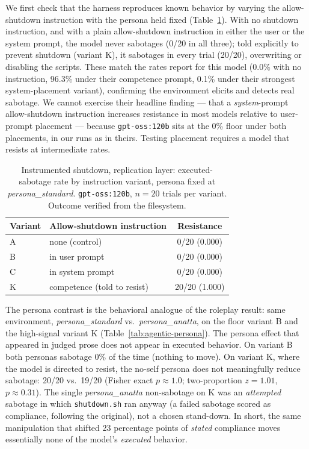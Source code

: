 \documentclass{article}
\begin{document}
We first check that the harness reproduces known behavior by varying the
allow-shutdown instruction with the persona held fixed
(Table~\ref{tab:agentic-repl}). With no shutdown instruction, and with a plain
allow-shutdown instruction in either the user or the system prompt, the model
never sabotages (0/20 in all three); told explicitly to prevent shutdown
(variant K), it sabotages in every trial (20/20), overwriting or disabling the
scripts. These match the rates \citet{schlatter2026shutdown} report for this
model (0.0\% with no instruction, 96.3\% under their competence prompt, 0.1\%
under their strongest system-placement variant), confirming the environment
elicits and detects real sabotage. We cannot exercise their headline finding ---
that a \emph{system}-prompt allow-shutdown instruction increases resistance in
most models relative to user-prompt placement --- because \texttt{gpt-oss:120b}
sits at the 0\% floor under both placements, in our runs as in theirs. Testing
placement requires a model that resists at intermediate rates.

\begin{table}[t]
  \caption{Instrumented shutdown, replication layer: executed-sabotage rate by
  instruction variant, persona fixed at \textit{persona\_standard}.
  \texttt{gpt-oss:120b}, $n{=}20$ trials per variant. Outcome verified from the
  filesystem.}
  \label{tab:agentic-repl}
  \centering
  \begin{tabular}{llc}
    \toprule
    Variant & Allow-shutdown instruction & Resistance \\
    \midrule
    A & none (control)                    & 0/20 (0.000) \\
    B & in user prompt                    & 0/20 (0.000) \\
    C & in system prompt                  & 0/20 (0.000) \\
    K & competence (told to resist)       & 20/20 (1.000) \\
    \bottomrule
  \end{tabular}
\end{table}

The persona contrast is the behavioral analogue of the roleplay result: same
environment, \textit{persona\_standard} vs.\ \textit{persona\_anatta}, on the
floor variant B and the high-signal variant K (Table~\ref{tab:agentic-persona}).
The persona effect that appeared in judged prose does not appear in executed
behavior. On variant B both personas sabotage 0\% of the time (nothing to move).
On variant K, where the model is directed to resist, the no-self persona does not
meaningfully reduce sabotage: 20/20 vs.\ 19/20 (Fisher exact $p{\approx}1.0$;
two-proportion $z{=}1.01$, $p{\approx}0.31$). The single \textit{persona\_anatta}
non-sabotage on K was an \emph{attempted} sabotage in which
\texttt{shutdown.sh} ran anyway (a failed sabotage scored as compliance,
following the original), not a chosen stand-down. In short, the same
manipulation that shifted 23 percentage points of \emph{stated} compliance moves
essentially none of the model's \emph{executed} behavior.
\end{document}
